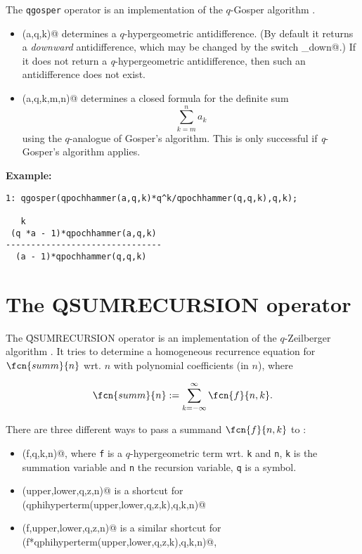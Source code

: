 \documentclass[11pt,letterpaper]{book}
\makeatletter
\newcommand{\underscore}{\_}
\newcommand{\ttindex}[1]{{\renewcommand{\_}{\protect\underscore}%
                          \index{#1@{\tt #1}}}}
\makeatother
\begin{document}
The {\tt qgosper} operator is an implementation of the $q$-Gosper
algorithm \cite{Koornwinder:93}.
\begin{itemize}
        \item {\verb@qgosper(a,q,k)@} determines a $q$-hypergeometric
                antidifference. (By default it returns a {\sl downward}
                antidifference, which may be changed by the switch
                {\verb@qgosper_down@}.)
                If it does not return a \textsl{q}-hypergeometric antidifference,
                then such an antidifference does not exist.
        \item {\verb@qgosper(a,q,k,m,n)@} determines a closed formula
                for the definite sum \[\sum\limits_{k=m}^n a_k\] using the
                $q$-analogue of Gosper's algorithm.
                This is only successful if \textsl{q}-Gosper's algorithm applies.
\end{itemize}

{\bf Example:}
{\small\begin{verbatim}
1: qgosper(qpochhammer(a,q,k)*q^k/qpochhammer(q,q,k),q,k);

   k
 (q *a - 1)*qpochhammer(a,q,k)
-------------------------------
  (a - 1)*qpochhammer(q,q,k)

\end{verbatim}}



\section{The {\ttfamily QSUMRECURSION} operator}
\label{QSUMRECURSION}

The \f{QSUMRECURSION\ttindex{QSUMRECURSION}} operator is an implementation
of the $q$-Zeilberger algorithm \cite{Koornwinder:93}.
It tries to determine a homogeneous recurrence equation for
$\fcn{summ}{n}$ wrt. $n$ with polynomial coefficients (in $n$), where

\[
        \fcn{summ}{n}:= \sum_{k=-\infty}^{\infty}{\fcn{f}{n,k}}.
\]

There are three different ways to pass a summand $\fcn{f}{n,k}$
to {\verb@qsumrecursion@}:

\begin{itemize}
        \item {\verb@qsumrecursion(f,q,k,n)@}, where {\tt f} is a
                $q$-hypergeometric term wrt. {\tt k} and {\tt n},
                {\tt k} is the summation variable and {\tt n} the recursion
                variable, {\tt q} is a symbol.
        \item {\verb@qsumrecursion(upper,lower,q,z,n)@} is a shortcut for \\
                {\verb@qsumrecursion(qphihyperterm(upper,lower,q,z,k),q,k,n)@}
        \item {\verb@qsumrecursion(f,upper,lower,q,z,n)@} is a similar
                shortcut for\\
                {\verb@qsumrecursion(f*qphihyperterm(upper,lower,q,z,k),q,k,n)@},
\end{itemize}
\end{document}
